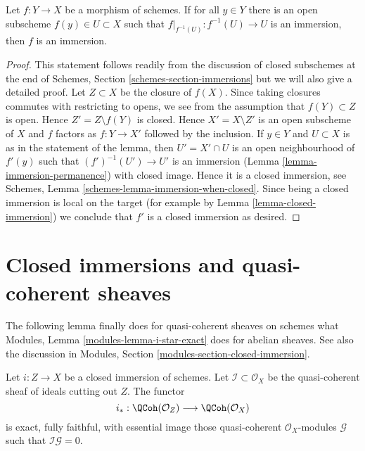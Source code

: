 \begin{lemma}
\label{lemma-check-immersion}
Let $f : Y \to X$ be a morphism of schemes. If for all $y \in Y$
there is an open subscheme $f(y) \in U \subset X$ such that
$f|_{f^{-1}(U)} : f^{-1}(U) \to U$ is an immersion, then $f$ is
an immersion.
\end{lemma}

\begin{proof}
This statement follows readily from the discussion of closed subschemes
at the end of Schemes, Section \ref{schemes-section-immersions}
but we will also give a detailed proof.
Let $Z \subset X$ be the closure of $f(X)$. Since taking closures
commutes with restricting to opens, we see from the assumption that
$f(Y) \subset Z$ is open. Hence $Z' = Z \setminus f(Y)$ is closed.
Hence $X' = X \setminus Z'$ is an open subscheme of $X$ and
$f$ factors as $f : Y \to X'$ followed by the inclusion.
If $y \in Y$ and $U \subset X$ is as in the statement
of the lemma, then $U' = X' \cap U$ is an open neighbourhood
of $f'(y)$ such that $(f')^{-1}(U') \to U'$ is an immersion
(Lemma \ref{lemma-immersion-permanence}) with closed image.
Hence it is a closed immersion, see
Schemes, Lemma \ref{schemes-lemma-immersion-when-closed}.
Since being a closed immersion is local on the target
(for example by Lemma \ref{lemma-closed-immersion})
we conclude that $f'$ is a closed immersion as desired.
\end{proof}








\section{Closed immersions and quasi-coherent sheaves}
\label{section-closed-immersions-quasi-coherent}

\noindent
The following lemma finally does for quasi-coherent sheaves on schemes
what Modules, Lemma \ref{modules-lemma-i-star-exact} does for abelian sheaves.
See also the discussion in
Modules, Section \ref{modules-section-closed-immersion}.

\begin{lemma}
\label{lemma-i-star-equivalence}
Let $i : Z \to X$ be a closed immersion of schemes. Let
$\mathcal{I} \subset \mathcal{O}_X$ be the quasi-coherent sheaf of ideals
cutting out $Z$. The functor
$$
i_* :
\QCoh(\mathcal{O}_Z)
\longrightarrow
\QCoh(\mathcal{O}_X)
$$
is exact, fully faithful, with essential image those quasi-coherent
$\mathcal{O}_X$-modules $\mathcal{G}$ such that $\mathcal{I}\mathcal{G} = 0$.
\end{lemma}

